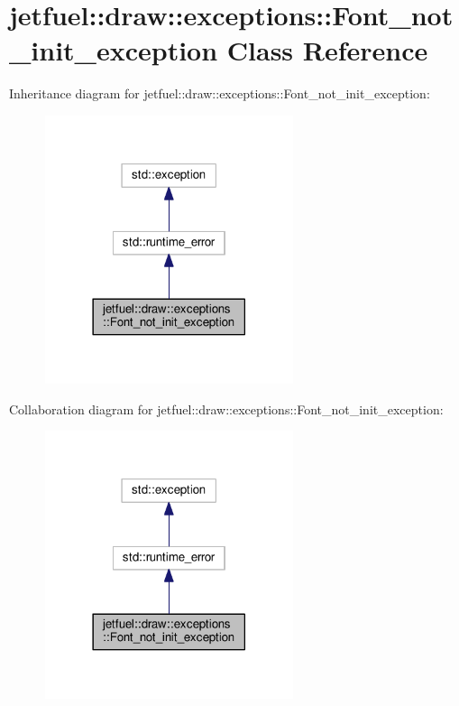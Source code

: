 \hypertarget{classjetfuel_1_1draw_1_1exceptions_1_1Font__not__init__exception}{}\section{jetfuel\+:\+:draw\+:\+:exceptions\+:\+:Font\+\_\+not\+\_\+init\+\_\+exception Class Reference}
\label{classjetfuel_1_1draw_1_1exceptions_1_1Font__not__init__exception}


Inheritance diagram for jetfuel\+:\+:draw\+:\+:exceptions\+:\+:Font\+\_\+not\+\_\+init\+\_\+exception\+:
\nopagebreak
\begin{figure}[H]
\begin{center}
\leavevmode
\includegraphics[width=206pt]{classjetfuel_1_1draw_1_1exceptions_1_1Font__not__init__exception__inherit__graph}
\end{center}
\end{figure}


Collaboration diagram for jetfuel\+:\+:draw\+:\+:exceptions\+:\+:Font\+\_\+not\+\_\+init\+\_\+exception\+:
\nopagebreak
\begin{figure}[H]
\begin{center}
\leavevmode
\includegraphics[width=206pt]{classjetfuel_1_1draw_1_1exceptions_1_1Font__not__init__exception__coll__graph}
\end{center}
\end{figure}
